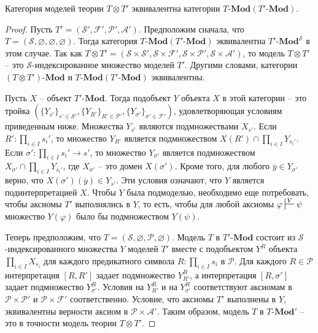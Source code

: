 \documentclass[reqno]{amsart}
\theoremstyle{definition}
\theoremstyle{remark}
\newcommand{\bcat}[1]{\mathbf{#1}}
\newcommand{\Mod}[1]{#1\text{-}\bcat{Mod}}
\begin{document}
\begin{prop}
Категория моделей теории $T \otimes T'$ эквивалентна категории $\Mod{T}(\Mod{T'})$.
\end{prop}
\begin{proof}
Пусть $T' = (\mathcal{S}',\mathcal{F}',\mathcal{P}',\mathcal{A}')$.
Предположим сначала, что $T = (\mathcal{S},\varnothing,\varnothing,\varnothing)$.
Тогда категория $\Mod{T}(\Mod{T'})$ эквивалентна $\Mod{T'}^\mathcal{S}$ в этом случае.
Так как $T \otimes T' = (\mathcal{S} \times \mathcal{S}', \mathcal{S} \times \mathcal{F}', \mathcal{S} \times \mathcal{P}', \mathcal{S} \times \mathcal{A}')$, то модель $T \otimes T'$ -- это $\mathcal{S}$-индексированное множество моделей $T'$.
Другими словами, категории $\Mod{(T \otimes T')}$ и $\Mod{T}(\Mod{T'})$ эквивалентны.

Пусть $X$ -- объект $\Mod{T'}$.
Тогда подобъект $Y$ объекта $X$ в этой категории -- это тройка $(\{ Y_{s'} \}_{s' \in \mathcal{S}'}, \{ Y_{R'} \}_{R' \in \mathcal{P}'}, \{ Y_{\sigma'} \}_{\sigma' \in \mathcal{F}'})$, удовлетворяющая условиям приведенным ниже.
Множества $Y_{s'}$ являются подмножествами $X_{s'}$.
Если $R' : \prod_{i \in I} s_i'$, то множество $Y_{R'}$ является подмножеством $X(R') \cap \prod_{i \in I} Y_{s_i'}$.
Если $\sigma' : \prod_{i \in I} s_i' \to s'$, то множество $Y_{\sigma'}$ является подмножеством $X_{\sigma'} \cap \prod_{i \in I} Y_{s_i'}$, где $X_{\sigma'}$ -- это домен $X(\sigma')$.
Кроме того, для любого $\overline{y} \in Y_{\sigma'}$ верно, что $X(\sigma')(\overline{y}) \in Y_{s'}$.
Эти условия означают, что $Y$ является подинтерпретацией $X$.
Чтобы $Y$ была подмоделью, необходимо еще потребовать, чтобы аксиомы $T'$ выполнялись в $Y$, то есть, чтобы для любой аксиомы $\varphi \sststile{}{V} \psi$ множество $Y(\varphi)$ было бы подмножеством $Y(\psi)$.

Теперь предположим, что $T = (\mathcal{S},\varnothing,\mathcal{P},\varnothing)$.
Модель $T$ в $\Mod{T'}$ состоит из $\mathcal{S}$-индексированного множества $Y$ моделей $T'$ вместе с подобъектом $Y^R$ объекта $\prod_{i \in I} X_{s_i}$ для каждого предикатного символа $R : \prod_{i \in I} s_i$ в $\mathcal{P}$.
Для каждого $R \in \mathcal{P}$ интерпретация $[R,R']$ задает подмножество $Y^R_{R'}$, а интерпретация $[R,\sigma']$ задает подмножество $Y^R_{\sigma'}$.
Условия на $Y^R_{R'}$ и на $Y^R_{\sigma'}$ соответствуют аксиомам в $\mathcal{P} \times \mathcal{P}'$ и $\mathcal{P} \times \mathcal{F}'$ соответственно.
Условие, что аксиомы $T'$ выполнены в $Y$, эквивалентны верности аксиом в $\mathcal{P} \times \mathcal{A}'$.
Таким образом, модель $T$ в $\Mod{T}'$ -- это в точности модель теории $T \otimes T'$.


\end{proof}
\end{document}

